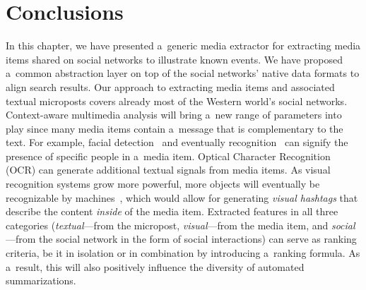 \section{Conclusions}

In this chapter, we have presented a~generic media extractor
for extracting media items shared on social networks to
illustrate known events.
We have proposed a~common abstraction layer on top of the
social networks' native data formats to align search results.
Our approach to extracting media items and associated
textual microposts covers already most of
the Western world's social networks.
Context-aware multimedia analysis will bring a~new range of
parameters into play since many media items contain a~message
that is complementary to the text.
For example, facial detection~\cite{viola2004facedetection}
and eventually recognition~\cite{wright2009facerecognition}
can signify the presence of specific people in a~media item.
Optical Character Recognition (OCR) can generate
additional textual signals from media items.
As visual recognition systems grow more powerful,
more objects will eventually be recognizable by
machines~\cite{serre2007objectrecognition},
which would allow for generating \emph{visual hashtags}
that describe the content
\emph{inside} of the media item.
Extracted features in all three categories
(\emph{textual}---from the micropost,
\emph{visual}---from the media item,
and \emph{social}---from the social network
in the form of social interactions)
can serve as ranking criteria, be it in isolation
or in combination by introducing a~ranking formula.
As a~result, this will also positively influence
the diversity of automated summarizations.

